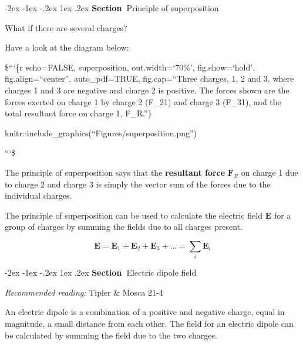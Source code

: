 \documentclass[
]{book}
\makeatletter
\renewcommand\section{%
\@startsection{section}{1}{\z@}%
              {-2ex \@plus -1ex \@minus -.2ex}%
              {1ex \@plus .2ex}%
              {\sffamily\bfseries\large\noindent Section~}}
\makeatother
\begin{document}
\hypertarget{principle-of-superposition}{%
\section{Principle of superposition}\label{principle-of-superposition}}

What if there are several charges?

Have a look at the diagram below:

\$```\{r echo=FALSE, superposition, out.width=`70\%', fig.show=`hold', fig.align=``center'', auto\_pdf=TRUE, fig.cap=``Three charges, 1, 2 and 3, where charges 1 and 3 are negative and charge 2 is positive. The forces shown are the forces exerted on charge 1 by charge 2 (F\_21) and charge 3 (F\_31), and the total resultant force on charge 1, F\_R.''\}

knitr::include\_graphics(``Figures/superposition.png'')

```\$

The principle of superposition says that the \textbf{resultant force} \(\mathbf{F}_R\)
on charge 1 due to charge 2 and charge 3 is simply the vector sum of the
forces due to the individual charges.

The principle of superposition can be used to calculate the electric
field \(\mathbf{E}\) for a group of charges by summing the fields due to all
charges present.

\begin{equation}
\label{eq:superposition}
\mathbf{E} = \mathbf{E}_1 + \mathbf{E}_2 + \mathbf{E}_3 + ... = \sum_i \mathbf{E}_i 
\end{equation}

\hypertarget{electric-dipole-field}{%
\section{Electric dipole field}\label{electric-dipole-field}}

\emph{Recommended reading:} Tipler \& Mosca 21-4

An electric dipole is a combination of a positive and negative charge,
equal in magnitude, a small distance from each other. The field for an
electric dipole can be calculated by summing the field due to the two
charges.
\end{document}
